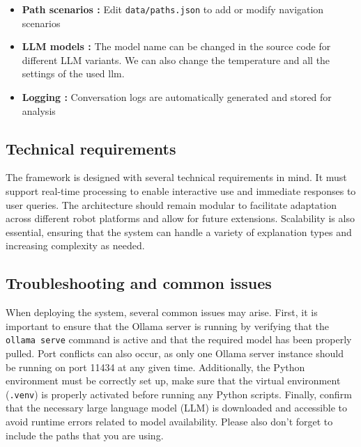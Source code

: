 \begin{itemize}
    \item \textbf{Path scenarios :} Edit \texttt{data/paths.json} to add or modify navigation scenarios
    \item \textbf{LLM models :} The model name can be changed in the source code for different LLM variants. We can also change the temperature and all the settings of the used llm.
    \item \textbf{Logging :} Conversation logs are automatically generated and stored for analysis
\end{itemize}

\subsection{Technical requirements}

The framework is designed with several technical requirements in mind.
It must support real-time processing to enable interactive use and immediate responses to user queries.
The architecture should remain modular to facilitate adaptation across different robot platforms and allow for future extensions.
Scalability is also essential, ensuring that the system can handle a variety of explanation types and increasing complexity as needed.


\subsection{Troubleshooting and common issues}

When deploying the system, several common issues may arise. First, it is important to ensure that the Ollama server is running by verifying that the \texttt{ollama serve} command is active and that the required model has been properly pulled.
Port conflicts can also occur, as only one Ollama server instance should be running on port 11434 at any given time. Additionally, the Python environment must be correctly set up, make sure that the virtual environment (\texttt{.venv}) is properly activated before running any Python scripts.
Finally, confirm that the necessary large language model (LLM) is downloaded and accessible to avoid runtime errors related to model availability. Please also don't forget to include the paths that you are using.
